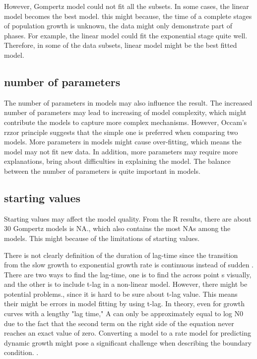 \documentclass[11pt]{article}
\begin{document}
However, Gompertz model could not fit all the subsets. In some cases, the linear model becomes the best model. this might because, the time of a complete stages of population growth is unknown, the data might only demonstrate part of phases. For example, the linear model could fit the exponential stage quite well. Therefore, in some of the data subsets, linear model might be the best fitted model. 

\subsection{number of parameters}
The number of parameters in models may also influence the result. The increased number of parameters may lead to increasing of model complexity, which might contribute the models to capture more complex mechanisms. However, Occam’s rzzor principle suggests that the simple one is preferred when comparing two models\cite{domingos1999}. More parameters in models might cause over-fitting, which means the model may not fit new data\cite{domingos1999}. In addition, more parameters may require more explanations, bring about difficulties in explaining the model. The balance between the number of parameters is quite important in models. 

\subsection{starting values}
Starting values may affect the model quality. From the R results, there are about 30 Gompertz models is NA., which also contains the most NAs among the models. This might because of the limitations of starting values.

There is not clearly definition of the duration of lag-time since the transition from the slow growth to exponential growth rate is continuous instead of sudden \cite{peleg2011}. There are two ways to find the lag-time, one is to find the across point s visually, and the other is to include t-lag in a non-linear model\cite{mckellar2003}. However, there might be potential problems., since it is hard to be sure about t-lag value. This means their might be errors in model fitting by using t-lag. In theory, even for growth curves with a lengthy "lag time," A can only be approximately equal to log N0 due to the fact that the second term on the right side of the equation never reaches an exact value of zero. Converting a model to a rate model for predicting dynamic growth might pose a significant challenge when describing the boundary condition. .
\end{document}
